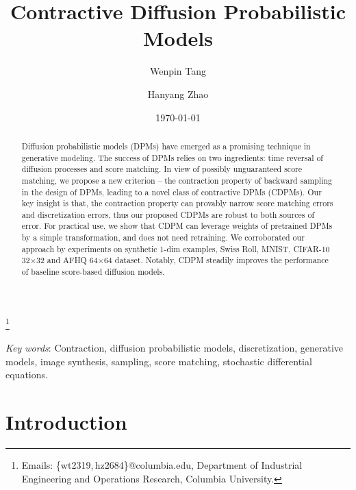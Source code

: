 \documentclass[letterpaper,10pt,reqno]{amsart}
\numberwithin{equation}{section}
\begin{document}
\title[CDPM]{Contractive Diffusion Probabilistic Models}

\author[Wenpin Tang]{{Wenpin} Tang}
\thanks{Emails: \{wt2319,\,hz2684\}@columbia.edu, Department of Industrial Engineering and Operations Research, Columbia University.}

\author[Hanyang Zhao]{{Hanyang} Zhao}

\date{\today}
\begin{abstract}
Diffusion probabilistic models (DPMs) have emerged as a promising technique in generative modeling. The success of DPMs relies on two ingredients: time reversal of diffusion processes and score matching. 
In view of possibly unguaranteed score matching, we propose a new criterion -- the contraction property of backward sampling in the design of DPMs, leading to a novel class of contractive DPMs (CDPMs). 
Our key insight is that,
the contraction property can provably narrow score matching errors and discretization errors, thus our proposed CDPMs are robust to both sources of error. 
For practical use, we show that CDPM can leverage weights of pretrained DPMs by a simple transformation, and does not need retraining. 
We corroborated our approach by experiments on synthetic 1-dim examples, 
Swiss Roll, MNIST, CIFAR-10 32$\times$32 and AFHQ 64$\times$64 dataset. 
Notably, CDPM steadily improves the performance of baseline score-based diffusion models.
\end{abstract}

\maketitle

\textit{Key words}: Contraction, diffusion probabilistic models, discretization, generative models,
image synthesis, sampling, score matching, stochastic differential equations.

\section{Introduction}
\label{sc1}
\end{document}
